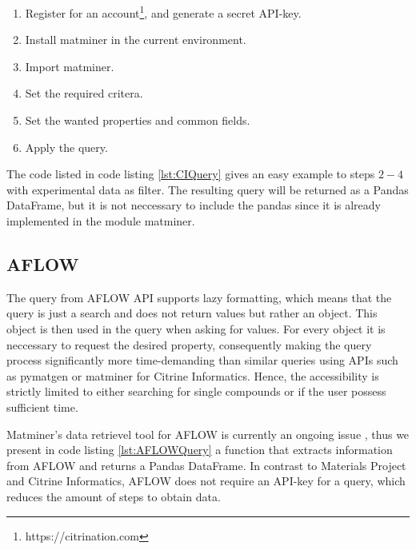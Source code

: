 \begin{enumerate}
  \item Register for an account\footnote{https://citrination.com}, and generate a secret API-key.
  \item Install matminer in the current environment.
  \item Import matminer.
  \item Set the required critera.
  \item Set the wanted properties and common fields.
  \item Apply the query.
\end{enumerate}

The code listed in code listing \ref{lst:CIQuery} gives an easy example to steps $2-4$ with experimental data as filter. The resulting query will be returned as a Pandas DataFrame, but it is not neccessary to include the pandas since it is already implemented in the module matminer.



\subsection{AFLOW}

The query from AFLOW API \cite{Curtarolo2012} supports lazy formatting, which means that the query is just a search and does not return values but rather an object. This object is then used in the query when asking for values. For every object it is neccessary to request the desired property, consequently making the query process significantly more time-demanding than similar queries using APIs such as pymatgen or matminer for Citrine Informatics. Hence, the accessibility is strictly limited to either searching for single compounds or if the user possess sufficient time.

Matminer's data retrievel tool for AFLOW is currently an ongoing issue \cite{Rosenbrock2017}, thus we present in code listing \ref{lst:AFLOWQuery} a function that extracts information from AFLOW and returns a Pandas DataFrame. In contrast to Materials Project and Citrine Informatics, AFLOW does not require an API-key for a query, which reduces the amount of steps to obtain data.

